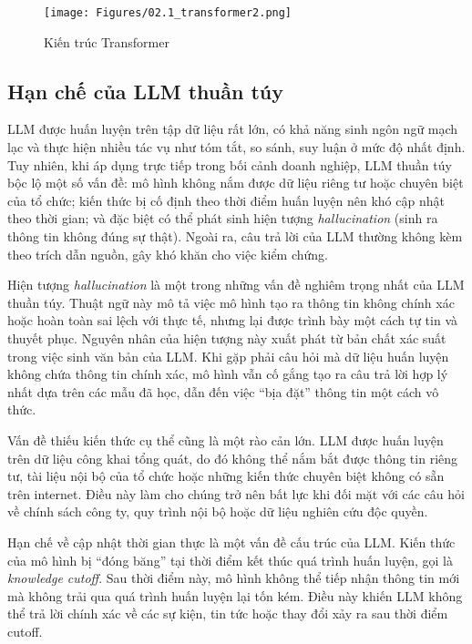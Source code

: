 \begin{figure}[H]
    \centering
    \texttt{[image: Figures/02.1\_transformer2.png]}
    \caption{Kiến trúc Transformer}
    \label{fig:transformer}
\end{figure}

\subsection{Hạn chế của LLM thuần túy}

LLM được huấn luyện trên tập dữ liệu rất lớn, có khả năng sinh ngôn ngữ mạch lạc và thực hiện nhiều tác vụ như tóm tắt, so sánh, suy luận ở mức độ nhất định. Tuy nhiên, khi áp dụng trực tiếp trong bối cảnh doanh nghiệp, LLM thuần túy bộc lộ một số vấn đề: mô hình không nắm được dữ liệu riêng tư hoặc chuyên biệt của tổ chức; kiến thức bị cố định theo thời điểm huấn luyện nên khó cập nhật theo thời gian; và đặc biệt có thể phát sinh hiện tượng \emph{hallucination} (sinh ra thông tin không đúng sự thật). Ngoài ra, câu trả lời của LLM thường không kèm theo trích dẫn nguồn, gây khó khăn cho việc kiểm chứng.

Hiện tượng \emph{hallucination} là một trong những vấn đề nghiêm trọng nhất của LLM thuần túy. Thuật ngữ này mô tả việc mô hình tạo ra thông tin không chính xác hoặc hoàn toàn sai lệch với thực tế, nhưng lại được trình bày một cách tự tin và thuyết phục. Nguyên nhân của hiện tượng này xuất phát từ bản chất xác suất trong việc sinh văn bản của LLM. Khi gặp phải câu hỏi mà dữ liệu huấn luyện không chứa thông tin chính xác, mô hình vẫn cố gắng tạo ra câu trả lời hợp lý nhất dựa trên các mẫu đã học, dẫn đến việc ``bịa đặt'' thông tin một cách vô thức.

Vấn đề thiếu kiến thức cụ thể cũng là một rào cản lớn. LLM được huấn luyện trên dữ liệu công khai tổng quát, do đó không thể nắm bắt được thông tin riêng tư, tài liệu nội bộ của tổ chức hoặc những kiến thức chuyên biệt không có sẵn trên internet. Điều này làm cho chúng trở nên bất lực khi đối mặt với các câu hỏi về chính sách công ty, quy trình nội bộ hoặc dữ liệu nghiên cứu độc quyền.

Hạn chế về cập nhật thời gian thực là một vấn đề cấu trúc của LLM. Kiến thức của mô hình bị ``đóng băng'' tại thời điểm kết thúc quá trình huấn luyện, gọi là \emph{knowledge cutoff}. Sau thời điểm này, mô hình không thể tiếp nhận thông tin mới mà không trải qua quá trình huấn luyện lại tốn kém. Điều này khiến LLM không thể trả lời chính xác về các sự kiện, tin tức hoặc thay đổi xảy ra sau thời điểm cutoff.

